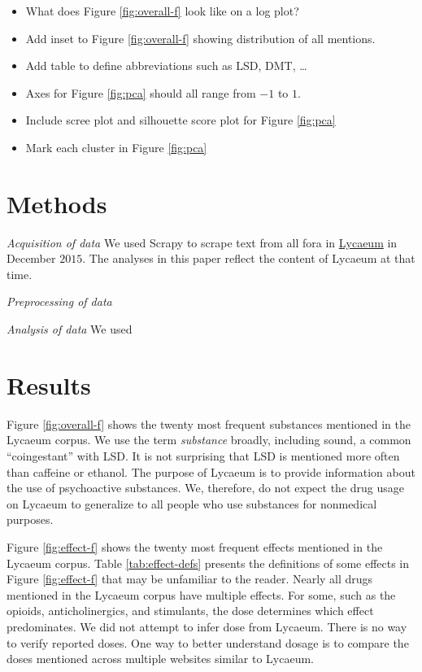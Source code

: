 \documentclass{article}
\begin{document}
 \graphicspath{{imgs/}} 
 
 
 {\color{red}
   \begin{itemize}
   	\item What does Figure \ref{fig:overall-f} look like on a log plot?
   	\item Add inset to Figure \ref{fig:overall-f} showing distribution of all mentions. 
   	\item Add table to define abbreviations such as LSD, DMT, \ldots
   	\item Axes for Figure \ref{fig:pca} should all range from $-1$ to $1$. 
   	\item Include scree plot and silhouette score plot for Figure \ref{fig:pca}
   	\item Mark each cluster in Figure \ref{fig:pca}
   \end{itemize}
 }
 
\section*{Methods}

 \emph{Acquisition of data}
 	We used Scrapy \cite{myers2015} to scrape text from all fora in \href{http://www.lycaeum.org}{Lycaeum} in December $2015$. The analyses in this paper reflect the content of Lycaeum at that time. 
 
\emph{Preprocessing of data}	
 	
\emph{Analysis of data} We used 
 
\section*{Results}

  Figure \ref{fig:overall-f} shows the twenty most frequent substances mentioned in the Lycaeum corpus. We use the term \emph{substance} broadly, including sound, a common ``coingestant'' with LSD. It is not surprising that LSD is mentioned more often than caffeine or ethanol. The purpose of Lycaeum is to provide information about the use of psychoactive substances. We, therefore, do not expect the drug usage on Lycaeum to generalize to all people who use substances for nonmedical purposes.
  
  Figure \ref{fig:effect-f} shows the twenty most frequent effects mentioned in the Lycaeum corpus. Table \ref{tab:effect-defs} presents the definitions of some effects in Figure \ref{fig:effect-f} that may be unfamiliar to the reader. Nearly all drugs mentioned in the Lycaeum corpus have multiple effects. For some, such as the opioids, anticholinergics, and stimulants, the dose determines which effect predominates. We did not attempt to infer dose from Lycaeum. There is no way to verify reported doses. One way to better understand dosage is to compare the doses mentioned across multiple websites similar to Lycaeum. 
\end{document}
